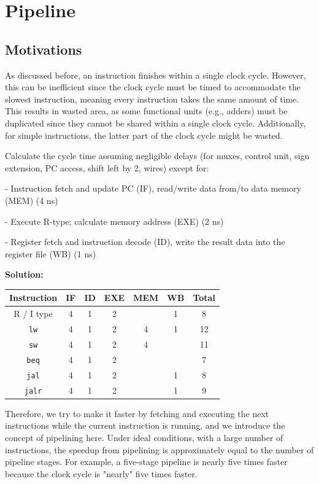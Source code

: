 \chapter{Pipeline}

\section{Motivations}
As discussed before, an instruction finishes within a single clock cycle. However, this can be inefficient since the clock cycle must be timed to accommodate the slowest instruction, meaning every instruction takes the same amount of time. This results in wasted area, as some functional units (e.g., adders) must be duplicated since they cannot be shared within a single clock cycle. Additionally, for simple instructions, the latter part of the clock cycle might be wasted.

\begin{eg}
  Calculate the cycle time assuming negligible delays (for muxes, control unit, sign extension, PC access, shift left by 2, wires) except for:

  - Instruction fetch and update PC (IF), read/write data from/to data memory (MEM) (4 ns)

  - Execute R-type; calculate memory address (EXE) (2 ns)

  - Register fetch and instruction decode (ID), write the result data into the register file (WB) (1 ns)

  \textbf{Solution:} 
  \begin{table}[H]
    \centering
    \begin{tabular}{c|c|c|c|c|c|c}
        \toprule
        Instruction & IF & ID & EXE & MEM & WB &  Total \\
      \midrule
        R / I type & 4 & 1 & 2 &  & 1 & 8  \\
        \verb|lw| & 4 & 1 & 2 & 4 & 1 & 12  \\
        \verb|sw| & 4 & 1 & 2 & 4 &  & 11  \\
        \verb|beq| & 4 & 1 & 2 &  &  & 7  \\
      \midrule
        \verb|jal| & 4 & 1 & 2 &  & 1 & 8  \\
        \verb|jalr| & 4 & 1 & 2 &  & 1 & 9  \\
        \bottomrule
    \end{tabular}
  \end{table}
\end{eg}

Therefore, we try to make it faster by fetching and executing the next instructions while the current instruction is running, and we introduce the concept of pipelining here. Under ideal conditions, with a large number of instructions, the speedup from pipelining is approximately equal to the number of pipeline stages. For example, a five-stage pipeline is nearly five times faster because the clock cycle is "nearly" five times faster.

